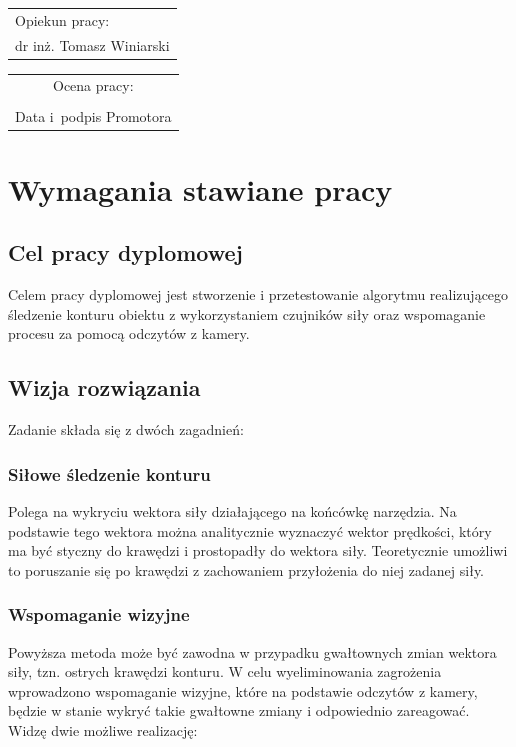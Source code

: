 \documentclass[12pt, a4paper, twoside]{book}
\begin{document}
\begin{titlepage}
			\vspace{20mm}
			\begin{flushright}
				\begin{tabular}{l}
					Opiekun pracy:\\
					\large dr inż. Tomasz Winiarski
				\end{tabular}
			\end{flushright}
			\vfill
			\begin{tabular}{c}
				\scriptsize Ocena pracy: \dotfill\\[10mm]
				\scriptsize \makebox[55mm]{\dotfill}\\
				\scriptsize Data i~podpis Promotora\\
				
			\end{tabular}
		\end{titlepage} 	


\newpage
\tableofcontents

\chapter{Wymagania stawiane pracy}
	\section{Cel pracy dyplomowej}
	Celem pracy dyplomowej jest stworzenie i przetestowanie algorytmu realizującego śledzenie konturu obiektu z wykorzystaniem czujników siły oraz wspomaganie procesu za pomocą odczytów z kamery.
	\section{Wizja rozwiązania}
	Zadanie składa się z dwóch zagadnień:
		\subsection{Siłowe śledzenie konturu}
		Polega na wykryciu wektora siły działającego na końcówkę narzędzia. Na podstawie tego wektora można analitycznie wyznaczyć wektor prędkości, który ma być styczny do krawędzi i prostopadły do wektora siły. Teoretycznie umożliwi to poruszanie się po krawędzi z zachowaniem przyłożenia do niej zadanej siły.
		\subsection{Wspomaganie wizyjne}
		Powyższa metoda może być zawodna w przypadku gwałtownych zmian wektora siły, tzn. ostrych krawędzi konturu. W celu wyeliminowania zagrożenia wprowadzono wspomaganie wizyjne, które na podstawie odczytów z kamery, będzie w stanie wykryć takie gwałtowne zmiany i odpowiednio zareagować. Widzę dwie możliwe realizację:
\end{document}
